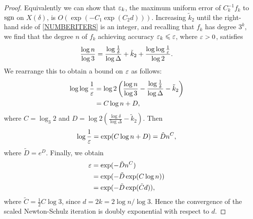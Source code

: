 \begin{proof}
Equivalently we can show that $\varepsilon_k$, the maximum uniform error of $C_k^{-1}f_k$ to $\text{sgn}$ on $X(\delta)$, is $O(\exp(-C_1 \exp(C_2 d)))$. Increasing $\tilde{k}_2$ until the right-hand side of \eqref{NUMBERITERS} is an integer, and recalling that $f_k$ has degree $3^k$, we find that the degree $n$ of $f_k$ achieving accuracy $\varepsilon_k \leqslant \varepsilon$, where $\varepsilon >0$, satisfies
\[\dfrac{\log n}{\log 3}=\dfrac{\log \frac{1}{\delta}}{\log \Delta} + \tilde{k}_2 +\dfrac{\log\log \frac{1}{\varepsilon}}{\log 2}.\]
We rearrange this to obtain a bound on $\varepsilon$ as follows:
\begin{align*}
    \log\log\frac{1}{\varepsilon} &= \log 2 \left(\dfrac{\log n}{\log 3}-\dfrac{\log\frac{1}{\delta}}{\log \Delta}-\tilde{k}_2\right)\\
    &=C\log n + D,
\end{align*}
where $C=\log_3 2$ and $D=\log 2\left(\frac{\log\delta}{\log\Delta} - \tilde{k}_2\right)$. Then
\[\log \dfrac{1}{\varepsilon}=\exp(C\log n+D) = \tilde{D} n^C,\]
where $\tilde{D}=e^D$. Finally, we obtain
\begin{align*}
    \varepsilon &= \exp(-\tilde{D}n^C)\\
    &=\exp(-\tilde{D}\exp(C\log n)) \\
    &= \exp(-\tilde{D}\exp(\tilde{C}d)),
\end{align*}
where $\tilde{C}=\frac{1}{2}C\log 3$, since $d=2k=2\log n /\log 3$. Hence the convergence of the scaled Newton-Schulz iteration is doubly exponential with respect to $d$.
\end{proof}

